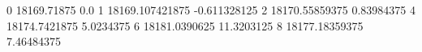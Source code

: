 0 18169.71875 0.0
1 18169.107421875 -0.611328125
2 18170.55859375 0.83984375
4 18174.7421875 5.0234375
6 18181.0390625 11.3203125
8 18177.18359375 7.46484375
